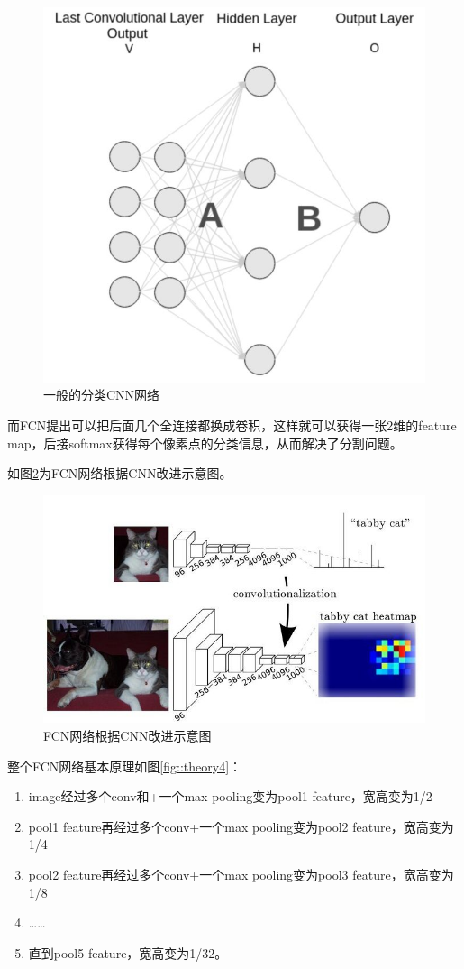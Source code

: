 \begin{figure}[htbp]
\centering
\includegraphics[width=0.6\linewidth]{body/theory_pic/2}
\caption{一般的分类CNN网络}
\label{fig::theory2}
\end{figure}

而FCN提出可以把后面几个全连接都换成卷积，这样就可以获得一张2维的feature
map，后接softmax获得每个像素点的分类信息，从而解决了分割问题。

如图\ref{fig::theory3}为FCN网络根据CNN改进示意图。

\begin{figure}[htbp]
\centering
\includegraphics[width=0.8\linewidth]{body/theory_pic/3}
\caption{FCN网络根据CNN改进示意图}
\label{fig::theory3}
\end{figure}

整个FCN网络基本原理如图\ref{fig::theory4}：

\begin{enumerate}
\def\labelenumi{\arabic{enumi}.}
\tightlist
\item
  image经过多个conv和+一个max pooling变为pool1 feature，宽高变为1/2
\item
  pool1 feature再经过多个conv+一个max pooling变为pool2
  feature，宽高变为1/4
\item
  pool2 feature再经过多个conv+一个max pooling变为pool3
  feature，宽高变为1/8
\item
  \ldots{}\ldots{}
\item
  直到pool5 feature，宽高变为1/32。
\end{enumerate}

